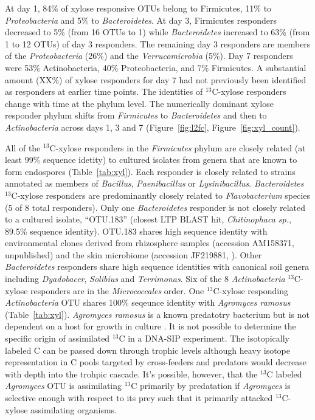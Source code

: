 At day 1, 84\% of xylose responsive OTUs belong to Firmicutes, 11\% to
\textit{Proteobacteria} and 5\% to \textit{Bacteroidetes}. At day 3,
Firmicutes responders decreased to 5\% (from 16 OTUs to 1) while
\textit{Bacteroidetes} increased to 63\% (from 1 to 12 OTUs) of day 3
responders. The remaining day 3 responders are members of the
\textit{Proteobacteria} (26\%) and the \textit{Verrucomicrobia} (5\%). Day 7
responders were 53\% Actinobacteria, 40\% Proteobacteria, and 7\% Firmicutes. A
substantial amount (XX\%) of xylose responders for day 7 had not previously
been identified as responders at earlier time points. The identities of $^{13}$C-xylose
responders change with time at the phylum level. The numerically dominant xylose
responder phylum shifts from \textit{Firmicutes} to \textit{Bacteroidetes} and
then to \textit{Actinobacteria} across days 1, 3 and 7 (Figure~\ref{fig:l2fc},
Figure~\ref{fig:xyl_count}). 

All of the $^{13}$C-xylose responders in the \textit{Firmicutes} phylum are
closely related (at least 99\% sequence idetity) to cultured isolates from
genera that are known to form endospores (Table~\ref{tab:xyl}). Each responder is closely
related to strains annotated as members of \textit{Bacillus},
\textit{Paenibacillus} or \textit{Lysinibacillus}. \textit{Bacteroidetes}
$^{13}$C-xylose responders are predominantly closely related to
\textit{Flavobacterium} species (5 of 8 total responders). Only one
\textit{Bacteroidetes} responder is not closely related to a cultured isolate,
``OTU.183'' (closest LTP BLAST hit, \textit{Chitinophaca sp.}, 89.5\% sequence
identity). OTU.183 shares high sequence identity with environmental clones
derived from rhizosphere samples (accession AM158371, unpublished) and the skin
microbiome (accession JF219881, \citet{Kong_2012}). Other \textit{Bacteroidetes} responders
share high sequence identities with canonical soil genera including
\textit{Dyadobacer}, \textit{Solibius} and \textit{Terrimonas}. Six of the 8
\textit{Actinobacteria} $^{13}$C-xylose responders are in the
\textit{Micrococcales} order. One $^{13}$C-xylose responding
\textit{Actinobacteria} OTU shares 100\% seqeunce identity with
\textit{Agromyces ramosus} (Table~\ref{tab:xyl}).  \textit{Agromyces ramosus} is a known
predatotry bacterium but is not dependent on a host for growth in culture
\citep{16346402}. It is not possible to determine the specific origin of assimilated
$^{13}$C in a DNA-SIP experiment. The isotopically labeled C can be passed down
through trophic levels although heavy isotope representation in C pools targeted by
cross-feeders and predators would decrease with depth into the trohpic cascade.
It's possible, however, that the $^{13}$C labeled \textit{Agromyces} OTU is
assimilating $^{13}$C primarily by predatation if \textit{Agromyces} is
selective enough with respect to its prey such that it primarily attacked
$^{13}$C-xylose assimilating organisms.

